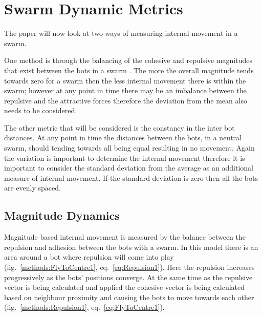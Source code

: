 \documentclass[10pt,journal,letterpaper,twoside]{IEEEtran}
\newcommand{\stability}{internal movement}
\newcommand{\Fig}{fig.}
\newcommand{\Eq}{eq.}
\begin{document}
\section{Swarm Dynamic Metrics\label{methods:SwarmStability}}
The paper will now look at two ways of measuring \stability{} in a swarm.

One method is through the balancing of the cohesive and repulsive magnitudes that exist between the bots in a swarm \cite{VGKP11} \cite{LBMFKV07}. The more the overall magnitude tends towards zero for a swarm then the less \stability{} there is within the swarm; however at any point in time there may be an imbalance between the repulsive and the attractive forces therefore the deviation from the mean also needs to be considered.

The other metric that will be considered is the constancy in the inter bot distances. At any point in time the distances between the bots, in a neutral swarm, should tending towards all being equal resulting in no movement. Again the variation is important to determine the \stability{} therefore it is important to consider the standard deviation from the average as an additional measure of \stability{}. If the standard deviation is zero then all the bots are evenly spaced.

\subsection{Magnitude Dynamics}

Magnitude based \stability{} is measured by the balance between the repulsion and adhesion between the bots with a swarm. In this model there is an area around a bot where repulsion will come into play (\Fig{}~\ref{methods:FlyToCentre1}, \Eq{}~\ref{eq:Repulsion1}).
Here the repulsion increases progressively as the bots' positions converge. At the same time as the repulsive vector is being calculated and applied the cohesive vector is being calculated based on neighbour proximity and causing the bots to move towards each other (\Fig{}~\ref{methods:Repulsion1}, \Eq{}~\ref{eq:FlyToCentre1}).
\end{document}
